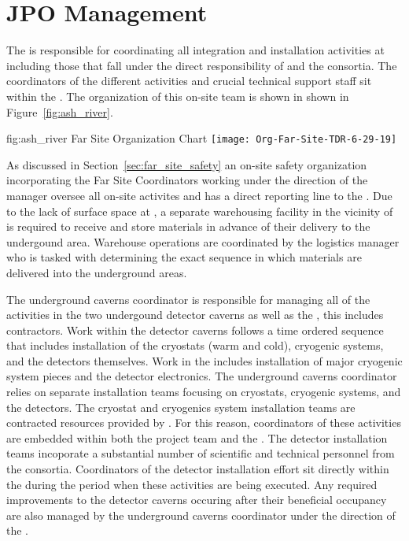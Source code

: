 \section{JPO Management}
\label{vl:tc-facility_mgmt}

The  is responsible for coordinating all integration and
installation activities at  including those that fall 
under the direct responsibility of  and the  
consortia.  The coordinators of the different activities and crucial 
technical support staff sit within the .  The organization
of this on-site team is shown in shown in Figure~\ref{fig:ash_river}.  
\begin{dunefigure}{fig:ash_river}
  {Far Site Organization Chart}
  \texttt{[image: Org-Far-Site-TDR-6-29-19]}
\end{dunefigure}
 
As discussed in Section~\ref{sec:far_site_safety} an on-site safety 
organization incorporating the Far Site  Coordinators
working under the direction of the  
 manager oversee all on-site activites and has a direct 
reporting line to the .  Due to the lack of surface space 
at , a separate warehousing facility in the vicinity of 
 is required to receive and store materials in advance 
of their delivery to the undergound area.  Warehouse operations are 
coordinated by the  logistics manager who is tasked 
with determining the exact sequence in which materials are delivered
into the underground areas.         

The underground caverns coordinator is responsible for managing all 
of the activities in the two undergound detector caverns as well as 
the , this includes contractors.  Work within the detector caverns follows a time 
ordered sequence that includes installation of the cryostats (warm
and cold), cryogenic systems, and the detectors themselves.  Work 
in the  includes installation of major cryogenic system 
pieces and the detector  electronics.  The underground 
caverns coordinator relies on separate installation teams focusing 
on cryostats, cryogenic systems, and the detectors.  The cryostat 
and cryogenics system installation teams are contracted resources 
provided by .  For this reason, coordinators of these 
activities are embedded within both the  project team 
and the .  The detector installation teams incoporate a 
substantial number of scientific and technical personnel from the 
 consortia.  Coordinators of the detector installation 
effort sit directly within the  during the period when 
these activities are being executed.  Any required improvements
to the detector caverns occuring after their beneficial 
occupancy are also managed by the underground caverns coordinator  
under the direction of the .

